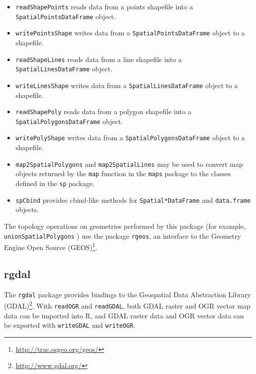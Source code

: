 \begin{itemize}

\item \texttt{readShapePoints} reads data from a points shapefile into
  a \texttt{SpatialPointsDataFrame} object.

\item \texttt{writePointsShape} writes data from a
  \texttt{SpatialPointsDataFrame} object to a shapefile.

\item \texttt{readShapeLines} reads data from a line shapefile
  into a \texttt{SpatialLinesDataFrame} object.

\item \texttt{writeLinesShape} writes data from a
  \texttt{SpatialLinesDataFrame} object to a shapefile.

\item \texttt{readShapePoly} reads data from a polygon shapefile into
  a \texttt{SpatialPolygonsDataFrame} object.

\item \texttt{writePolyShape} writes data from a
  \texttt{SpatialPolygonsDataFrame} object to a shapefile.

\item \texttt{map2SpatialPolygons} and \texttt{map2SpatialLines} may
  be used to convert map objects returned by the \texttt{map} function
  in the \texttt{maps} package to the classes defined in the
  \texttt{sp} package.

\item \texttt{spCbind} provides cbind-like methods for
  \texttt{Spatial*DataFrame} and \texttt{data.frame} objects.
 
\end{itemize}

The topology operations on geometries performed by this package (for
example, \texttt{unionSpatialPolygons} ) use the package
\texttt{rgeos}, an interface to the Geometry Engine Open Source
(GEOS)\footnote{\url{http://trac.osgeo.org/geos/}}.


\subsection{rgdal}
\label{sec:rgdal}

The \texttt{rgdal} package \cite{Bivand.Keitt.ea2013} provides
bindings to the Geospatial Data Abstraction Library
(GDAL)\footnote{\url{http://www.gdal.org/}}. With \texttt{readOGR} and
\texttt{readGDAL}, both GDAL raster and OGR vector map data can be
imported into \textsf{R}, and GDAL raster data and OGR vector data can
be exported with \texttt{writeGDAL} and \texttt{writeOGR}.

